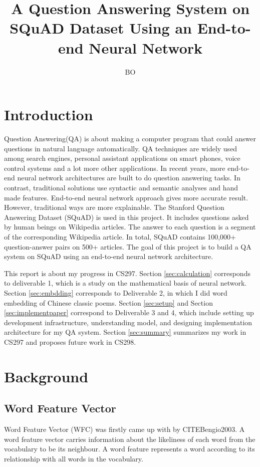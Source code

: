 \documentclass[modernstyle,12pt]{sjsuthesis}
\title{A Question Answering System on SQuAD Dataset Using an End-to-end Neural Network}
\author{BO}{LI}
\theoremstyle{definition}
\begin{document}
\raggedright          %
\parindent=30pt       %




\chapter{Introduction}

Question Answering(QA) is about making a computer program that could answer questions in natural language automatically. QA techniques are widely used among search engines, personal assistant applications on smart phones, voice control systems and a lot more other applications. In recent years, more end-to-end neural network architectures are built to do question answering tasks. In contrast, traditional solutions use syntactic and semantic analyses and hand made features. End-to-end neural network approach gives more accurate result. However, traditional ways are more explainable. The Stanford Question Answering Dataset (SQuAD) is used in this project. It includes questions asked by human beings on Wikipedia articles. The answer to each question is a segment of the corresponding Wikipedia article\cite{rajpurkar2016squad}. In total, SQuAD contains 100,000+ question-answer pairs on 500+ articles\cite{rajpurkar2016squad}. The goal of this project is to build a QA system on SQuAD using an end-to-end neural network architecture.

This report is about my progress in CS297. Section \ref{sec:calculation}  corresponds to deliverable 1, which is a study on the mathematical basis of neural network. Section \ref{sec:embdding} corresponds to Deliverable 2, in which I did word embedding of Chinese classic poems. Section \ref{sec:setup} and Section \ref{sec:implementpaper} correspond to Deliverable 3 and 4, which include setting up development infrastructure, understanding model, and designing implementation architecture for my QA system. Section \ref{sec:summary} summarizes my work in CS297 and proposes future work in CS298.

\chapter{Background}
\section{Word Feature Vector}
Word Feature Vector (WFC) was firstly came up with by CITEBengio2003. A word feature vector carries information about the likeliness of each word from the vocabulary to be its neighbour. A word feature represents a word according to its relationship with all words in the vocabulary.
\end{document}
